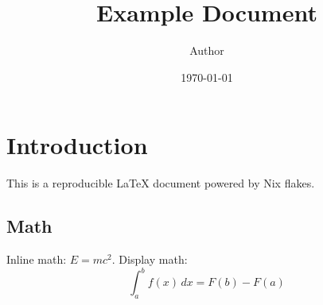\documentclass[a4paper]{article}
\title{Example Document}
\author{Author}
\date{\today}
\begin{document}
\maketitle

\section{Introduction}
This is a reproducible LaTeX document powered by Nix flakes.

\subsection{Math}
Inline math: \(E = mc^2\).
Display math:
\[
  \int_a^b f(x)\,dx = F(b) - F(a)
\]
\end{document}
